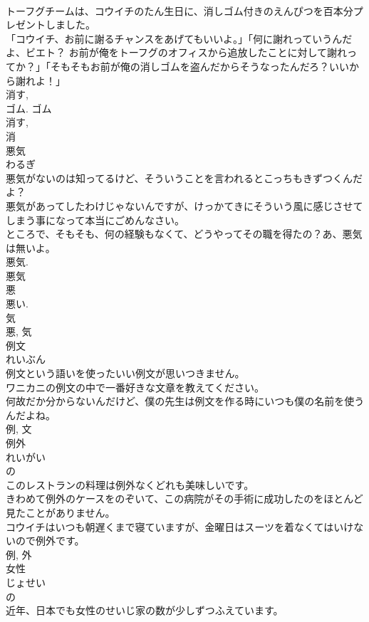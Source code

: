 \documentclass[8pt]{extreport}
\begin{document}
\begin{CJK}{UTF8}{min}
\\	トーフグチームは、コウイチのたん生日に、消しゴム付きのえんぴつを百本分プレゼントしました。	
\\	「コウイチ、お前に謝るチャンスをあげてもいいよ。」「何に謝れっていうんだよ、ビエト？ お前が俺をトーフグのオフィスから追放したことに対して謝れってか？」「そもそもお前が俺の消しゴムを盗んだからそうなったんだろ？いいから謝れよ！」	
\\	消す, 
\\	ゴム. ゴム 
\\	消す, 
\\	消	
\\	悪気	
\\	わるぎ	
\\	悪気がないのは知ってるけど、そういうことを言われるとこっちもきずつくんだよ？	
\\	悪気があってしたわけじゃないんですが、けっかてきにそういう風に感じさせてしまう事になって本当にごめんなさい。	
\\	ところで、そもそも、何の経験もなくて、どうやってその職を得たの？あ、悪気は無いよ。	
\\	悪気.	
\\	悪気 
\\	悪 
\\	悪い. 
\\	気 
\\	悪, 気	
\\	例文	
\\	れいぶん	
\\	例文という語いを使ったいい例文が思いつきません。	
\\	ワニカニの例文の中で一番好きな文章を教えてください。	
\\	何故だか分からないんだけど、僕の先生は例文を作る時にいつも僕の名前を使うんだよね。	
\\	例, 文	
\\	例外	
\\	れいがい	
\\	の 
\\	このレストランの料理は例外なくどれも美味しいです。	
\\	きわめて例外のケースをのぞいて、この病院がその手術に成功したのをほとんど見たことがありません。	
\\	コウイチはいつも朝遅くまで寝ていますが、金曜日はスーツを着なくてはいけないので例外です。	
\\	例, 外	
\\	女性	
\\	じょせい	
\\	の 
\\	近年、日本でも女性のせいじ家の数が少しずつふえています。	

\end{CJK}
\end{document}
